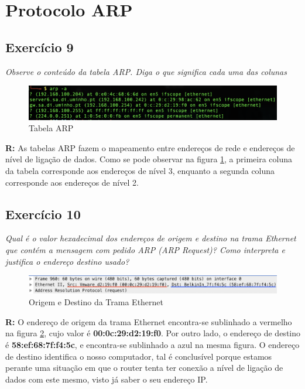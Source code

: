 \documentclass{llncs}
\begin{document}
\section{Protocolo ARP}

\subsection{Exercício 9}
\emph{Observe o conteúdo da tabela ARP. Diga o que significa cada uma das colunas}

\begin{figure}[H]
\begin{center}
\includegraphics[scale=0.45]{9.png} 
\end{center}
\caption{\label{fig:9}Tabela ARP}
\end{figure} 
\par
\textbf{R:} As tabelas ARP fazem o mapeamento entre endereços de rede e endereços de nível de ligação de dados. Como se pode observar na figura \ref{fig:9}, a primeira coluna da tabela corresponde aos endereços de nível 3, enquanto a segunda coluna corresponde aos endereços de nível 2.


\subsection{Exercício 10}
\emph{Qual é o valor hexadecimal dos endereços de origem e destino na trama Ethernet
que contém a mensagem com pedido ARP (ARP Request)? Como interpreta e justifica o 
endereço destino usado?}

\begin{figure}[H]
\begin{center}
\includegraphics[scale=0.45]{10.png} 
\end{center}
\caption{\label{fig:10}Origem e Destino da Trama Ethernet}
\end{figure} 
\par
\textbf{R:} O endereço de origem da trama Ethernet encontra-se sublinhado a vermelho na figura \ref{fig:10}, cujo valor é \textbf{00:0c:29:d2:19:f0}. Por outro lado, o endereço de destino é \textbf{58:ef:68:7f:f4:5c}, e encontra-se sublinhado a azul na mesma figura. O endereço de destino identifica o nosso computador, tal é conclusível porque estamos perante uma situação em que o router tenta ter conexão a nível de ligação de dados com este mesmo, visto já saber o seu endereço IP.
\end{document}
